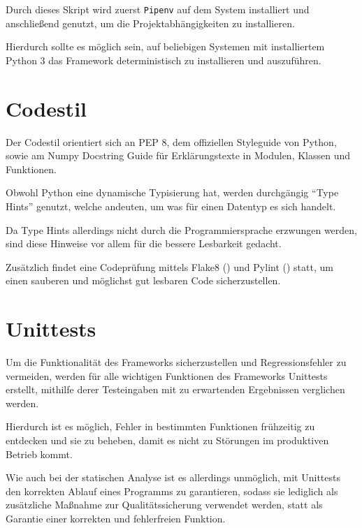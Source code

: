             Durch dieses Skript wird zuerst
            \lstinline{Pipenv} auf dem System installiert und
            anschließend genutzt,
            um die Projektabhängigkeiten zu installieren.

            Hierdurch sollte es möglich sein,
            auf beliebigen Systemen mit installiertem Python 3 das Framework deterministisch zu installieren und
            auszuführen.

    \section{Codestil}
        Der Codestil orientiert sich an
        \gls{PEP} 8,
        dem offiziellen Styleguide von Python\cite{Rossum2013},
        sowie
        am Numpy Docstring Guide für Erklärungstexte in Modulen,
        Klassen und
        Funktionen.\cite{numpydocmaintainers2018}

        Obwohl Python eine dynamische Typisierung hat,
        werden durchgängig
        \foreignquote{english}{Type Hints} genutzt,
        welche andeuten,
        um was für einen Datentyp es sich handelt.\cite{Rossum2014}

        Da Type Hints allerdings nicht durch die Programmiersprache erzwungen werden,
        sind diese Hinweise vor allem für die bessere Lesbarkeit gedacht.

        Zusätzlich findet eine Codeprüfung mittels Flake8
        (\cite{Cordasco2018}) und
        Pylint
        (\cite{PyCQA}) statt,
        um einen sauberen und
        möglichst gut lesbaren Code sicherzustellen.

    \section{Unittests}
        Um die Funktionalität des Frameworks sicherzustellen und
        Regressionsfehler zu vermeiden,
        werden für alle wichtigen Funktionen des Frameworks Unittests erstellt,
        mithilfe derer Testeingaben mit zu erwartenden Ergebnissen verglichen werden.

        Hierdurch ist es möglich,
        Fehler in bestimmten Funktionen frühzeitig zu entdecken und
        sie zu beheben,
        damit es nicht zu Störungen im produktiven Betrieb kommt.

        Wie auch bei der statischen Analyse ist es allerdings unmöglich,
        mit Unittests den korrekten Ablauf eines Programms zu garantieren,
        sodass sie lediglich als zusätzliche Maßnahme zur Qualitätssicherung verwendet werden,
        statt als Garantie einer korrekten und
        fehlerfreien Funktion.

